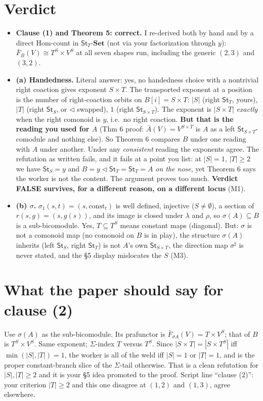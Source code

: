 \documentclass[11pt]{article}
\newcommand{\tri}{\mathbin{\triangleleft}}
\newcommand{\St}{\mathsf{St}}
\begin{document}
\section*{Verdict}
\begin{itemize}[leftmargin=*]
\item \textbf{Clause (1) and Theorem 5: correct.} I re-derived both by hand and by a direct
  $\mathrm{Hom}$-count in $\St_T$-$\mathbf{Set}$ (not via your factorization through $y$):
  $\bar F_B(V)\cong T^S\times V^S$ at all seven shapes run, including the generic $(2,3)$ and $(3,2)$.
\item \textbf{(a) Handedness.} Literal answer: yes, no handedness choice with a nontrivial right
  coaction gives exponent $S\times T$. The transported exponent at a position is the number of
  right-coaction orbits on $B[i]=S\times T$: $|S|$ (right $\St_T$, yours), $|T|$ (right $\St_S$, or
  $\tri$ swapped), $1$ (right $\St_{S\times T}$). The exponent is $|S\times T|$ \emph{exactly} when the
  right comonoid is $y$, i.e.\ no right coaction. \textbf{But that is the reading you used for $A$}
  (Thm 6 proof: $\bar A(V)=V^{S\times T}$ is $A$ as a left $\St_{S\times T}$-comodule and nothing
  else). So Theorem 6 compares $B$ under one reading with $A$ under another. Under any
  \emph{consistent} reading the exponents agree. The refutation as written fails, and it fails at a
  point you list: at $|S|=1$, $|T|\ge2$ we have $\St_S=y$ and $B=y\tri\St_T=\St_T=A$ \emph{on the nose},
  yet Theorem 6 says the worker is not the content. The argument proves too much.
  \textbf{Verdict FALSE survives, for a different reason, on a different locus} (M1).
\item \textbf{(b) $\sigma$.} $\sigma_1(s,t)=(s,\mathrm{const}_t)$ is well defined, injective
  ($S\neq\emptyset$), a section of $r(s,g)=(s,g(s))$, and its image is closed under $\lambda$ and
  $\rho$, so $\sigma(A)\subseteq B$ is a sub-bicomodule. Yes, $T\subseteq T^S$ means constant maps
  (diagonal). But: $\sigma$ is not a comonoid map (no comonoid on $B$ is in play), the structure
  $\sigma(A)$ inherits (left $\St_S$, right $\St_T$) is not $A$'s own $\St_{S\times T}$, the
  direction map $\sigma^\sharp$ is never stated, and the \S5 display mislocates the $S$ (M3).
\end{itemize}

\section*{What the paper should say for clause (2)}
Use $\sigma(A)$ as the sub-bicomodule. Its prafunctor is $\bar F_{\sigma A}(V)=T\times V^S$; that of $B$
is $T^S\times V^S$. Same exponent; $\Sigma$-index $T$ versus $T^S$. Since $|S\times T|=|S\times T^S|$ iff
$\min(|S|,|T|)=1$, the worker is all of the weld iff $|S|=1$ or $|T|=1$, and is the proper
constant-branch slice of the $\Sigma$-tail otherwise. That is a clean refutation for $|S|,|T|\ge2$ and it is
your \S5 idea promoted to the proof. Script line ``clause (2)'': your criterion $|T|\ge2$ and this one
disagree at $(1,2)$ and $(1,3)$, agree elsewhere.
\end{document}

